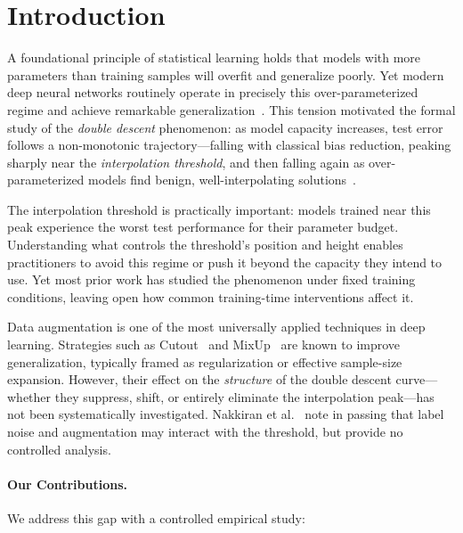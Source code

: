 \section{Introduction}

A foundational principle of statistical learning holds that models with more parameters than training samples will overfit and generalize poorly. Yet modern deep neural networks routinely operate in precisely this over-parameterized regime and achieve remarkable generalization~\cite{zhang2017understanding}. This tension motivated the formal study of the \emph{double descent} phenomenon: as model capacity increases, test error follows a non-monotonic trajectory---falling with classical bias reduction, peaking sharply near the \emph{interpolation threshold}, and then falling again as over-parameterized models find benign, well-interpolating solutions~\cite{belkin2019reconciling,nakkiran2020deep}.

The interpolation threshold is practically important: models trained near this peak experience the worst test performance for their parameter budget. Understanding what controls the threshold's position and height enables practitioners to avoid this regime or push it beyond the capacity they intend to use. Yet most prior work has studied the phenomenon under fixed training conditions, leaving open how common training-time interventions affect it.

Data augmentation is one of the most universally applied techniques in deep learning. Strategies such as Cutout~\cite{devries2017cutout} and MixUp~\cite{zhang2018mixup} are known to improve generalization, typically framed as regularization or effective sample-size expansion. However, their effect on the \emph{structure} of the double descent curve---whether they suppress, shift, or entirely eliminate the interpolation peak---has not been systematically investigated. Nakkiran et al.~\cite{nakkiran2020deep} note in passing that label noise and augmentation may interact with the threshold, but provide no controlled analysis.

\paragraph{Our Contributions.} We address this gap with a controlled empirical study:

